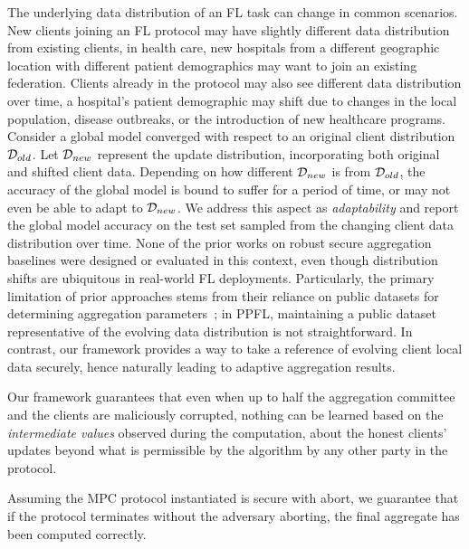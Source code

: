 The underlying data
distribution of an FL task can change in common scenarios. New clients joining an FL protocol may have slightly different data distribution from existing clients, \eg in health care, new hospitals from a different geographic location with different patient demographics may want to join an existing federation. Clients already in the protocol may also see different data distribution over time, \eg a hospital's patient demographic may shift due to changes in the local population, disease outbreaks, or the introduction of new healthcare programs. 
Consider a global model converged with respect to an original client distribution $\mathcal{D}_{old}$. 
Let $\mathcal{D}_{new}$ represent the update distribution, incorporating both original and shifted client data.
Depending on how different $\mathcal{D}_{new}$ is from $\mathcal{D}_{old}$, the accuracy of the global model is bound to suffer for a period of time, or may not even be able to adapt to $\mathcal{D}_{new}$. 
We address this aspect as \emph{adaptability} and report the global model accuracy on the test set sampled from the changing client data distribution over time. 
None of the prior works on robust secure aggregation baselines were designed or evaluated in this context, even though distribution shifts are ubiquitous in real-world FL deployments.
Particularly, the primary limitation of prior approaches stems from their reliance on public datasets for determining aggregation parameters~\cite{CCS:CGJv22}; in PPFL, maintaining a public dataset representative of the evolving data distribution is not straightforward. 
In contrast, our framework provides a way to take a reference of evolving client local data securely, hence naturally leading to adaptive aggregation results.


 Our framework guarantees that even when up to half the aggregation committee and the clients are maliciously corrupted, nothing can be learned based on the \emph{intermediate values} observed during the computation, about the honest clients' updates beyond what is permissible by the algorithm by any other party in the protocol. 

 Assuming the MPC protocol instantiated is secure with abort, we guarantee that if the protocol terminates without the adversary aborting, the final aggregate has been computed correctly.

